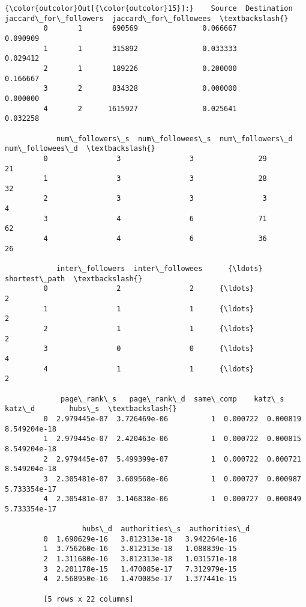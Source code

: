 \documentclass[11pt]{article}
\begin{document}
\begin{Verbatim}[commandchars=\\\{\}]
{\color{outcolor}Out[{\color{outcolor}15}]:}    Source  Destination  jaccard\_for\_followers  jaccard\_for\_followees  \textbackslash{}
         0       1       690569               0.066667               0.090909   
         1       1       315892               0.033333               0.029412   
         2       1       189226               0.200000               0.166667   
         3       2       834328               0.000000               0.000000   
         4       2      1615927               0.025641               0.032258   
         
            num\_followers\_s  num\_followees\_s  num\_followers\_d  num\_followees\_d  \textbackslash{}
         0                3                3               29               21   
         1                3                3               28               32   
         2                3                3                3                4   
         3                4                6               71               62   
         4                4                6               36               26   
         
            inter\_followers  inter\_followees      {\ldots}        shortest\_path  \textbackslash{}
         0                2                2      {\ldots}                    2   
         1                1                1      {\ldots}                    2   
         2                1                1      {\ldots}                    2   
         3                0                0      {\ldots}                    4   
         4                1                1      {\ldots}                    2   
         
             page\_rank\_s   page\_rank\_d  same\_comp    katz\_s    katz\_d        hubs\_s  \textbackslash{}
         0  2.979445e-07  3.726469e-06          1  0.000722  0.000819  8.549204e-18   
         1  2.979445e-07  2.420463e-06          1  0.000722  0.000815  8.549204e-18   
         2  2.979445e-07  5.499399e-07          1  0.000722  0.000721  8.549204e-18   
         3  2.305481e-07  3.609568e-06          1  0.000727  0.000987  5.733354e-17   
         4  2.305481e-07  3.146838e-06          1  0.000727  0.000849  5.733354e-17   
         
                  hubs\_d  authorities\_s  authorities\_d  
         0  1.690629e-16   3.812313e-18   3.942264e-16  
         1  3.756260e-16   3.812313e-18   1.088839e-15  
         2  1.311680e-16   3.812313e-18   1.031571e-18  
         3  2.201178e-15   1.470085e-17   7.312979e-15  
         4  2.568950e-16   1.470085e-17   1.377441e-15  
         
         [5 rows x 22 columns]
\end{Verbatim}
            
\end{document}
